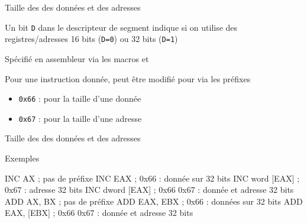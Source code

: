 \documentclass[14pt,xcolor,table]{beamer}
\begin{document}
\begin{frame}[fragile]{Taille des des données et des adresses}

	Un bit \verb_D_ dans le descripteur de segment indique
	si on utilise des registres/adresses 
	16 bits (\verb_D=0_) ou 32 bits (\verb_D=1_)
	
	\bigskip 
	Spécifié en assembleur via les macros 
	\asm{[BITS 16]} et \asm{[BITS 32]}

	\bigskip
	Pour une instruction donnée, 
	peut être modifié pour via les préfixes
	\begin{itemize}
		\item \verb_0x66_ : pour la taille d'une donnée
		\item \verb_0x67_ : pour la taille d'une adresse
	\end{itemize}
	
\end{frame}

\begin{frame}[fragile]{Taille des des données et des adresses}

	Exemples
	\begin{Asm}[basicstyle=\small]
	[BITS 16]
	INC AX             ; pas de préfixe
	INC	EAX            ; 0x66 : donnée sur 32 bits
	INC word [EAX]     ; 0x67 : adresse 32 bits
	INC dword [EAX]    ; 0x66 0x67 : donnée et adresse 32 bits
	ADD AX, BX         ; pas de préfixe
	ADD EAX, EBX       ; 0x66 : données sur 32 bits
	ADD EAX, [EBX]     ; 0x66 0x67 : donnée et adresse 32 bits
	\end{Asm}
	
\end{frame}

\end{document}
